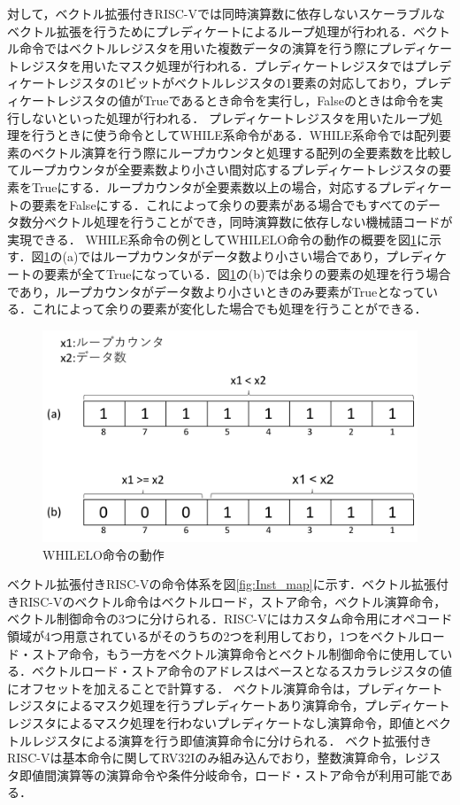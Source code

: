 対して，ベクトル拡張付きRISC-Vでは同時演算数に依存しないスケーラブルなベクトル拡張を行うためにプレディケートによるループ処理が行われる．ベクトル命令ではベクトルレジスタを用いた複数データの演算を行う際にプレディケートレジスタを用いたマスク処理が行われる．プレディケートレジスタではプレディケートレジスタの1ビットがベクトルレジスタの1要素の対応しており，プレディケートレジスタの値がTrueであるとき命令を実行し，Falseのときは命令を実行しないといった処理が行われる．
プレディケートレジスタを用いたループ処理を行うときに使う命令としてWHILE系命令がある．WHILE系命令では配列要素のベクトル演算を行う際にループカウンタと処理する配列の全要素数を比較してループカウンタが全要素数より小さい間対応するプレディケートレジスタの要素をTrueにする．ループカウンタが全要素数以上の場合，対応するプレディケートの要素をFalseにする．これによって余りの要素がある場合でもすべてのデータ数分ベクトル処理を行うことができ，同時演算数に依存しない機械語コードが実現できる．
WHILE系命令の例としてWHILELO命令の動作の概要を図\ref{fig:predicate}に示す．図\ref{fig:predicate}の(a)ではループカウンタがデータ数より小さい場合であり，プレディケートの要素が全てTrueになっている．図\ref{fig:predicate}の(b)では余りの要素の処理を行う場合であり，ループカウンタがデータ数より小さいときのみ要素がTrueとなっている．これによって余りの要素が変化した場合でも処理を行うことができる．

\begin{figure}[tb]
    \centering
    \includegraphics[scale=0.5]{image/predicate.pdf}
    \caption{WHILELO命令の動作}
    \label{fig:predicate}
\end{figure}

ベクトル拡張付きRISC-Vの命令体系を図\ref{fig:Inst_map}に示す．ベクトル拡張付きRISC-Vのベクトル命令はベクトルロード，ストア命令，ベクトル演算命令，ベクトル制御命令の3つに分けられる．RISC-Vにはカスタム命令用にオペコード領域が4つ用意されているがそのうちの2つを利用しており，1つをベクトルロード・ストア命令，もう一方をベクトル演算命令とベクトル制御命令に使用している．ベクトルロード・ストア命令のアドレスはベースとなるスカラレジスタの値にオフセットを加えることで計算する．
ベクトル演算命令は，プレディケートレジスタによるマスク処理を行うプレディケートあり演算命令，プレディケートレジスタによるマスク処理を行わないプレディケートなし演算命令，即値とベクトルレジスタによる演算を行う即値演算命令に分けられる．
ベクト拡張付きRISC-Vは基本命令に関してRV32Iのみ組み込んでおり，整数演算命令，レジスタ即値間演算等の演算命令や条件分岐命令，ロード・ストア命令が利用可能である．

